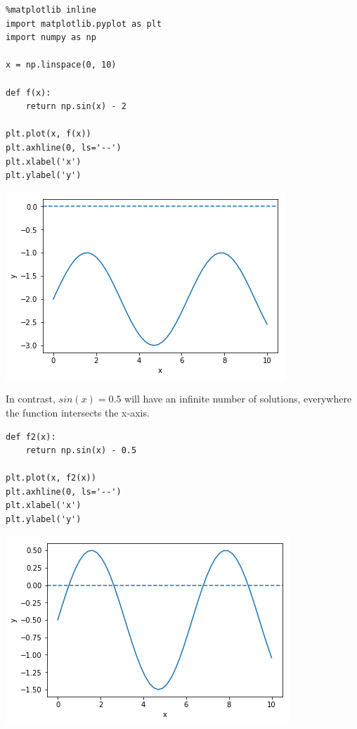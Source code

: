 \documentclass[11pt]{article}
\begin{document}
\begin{verbatim}
%matplotlib inline
import matplotlib.pyplot as plt
import numpy as np

x = np.linspace(0, 10)

def f(x):
    return np.sin(x) - 2

plt.plot(x, f(x))
plt.axhline(0, ls='--')
plt.xlabel('x')
plt.ylabel('y')
\end{verbatim}

\begin{center}
\includegraphics[width=.9\linewidth]{obipy-resources/a42b059ba3fd2f94b3a34f1c9b427f54-26729hzK.png}
\end{center}

In contrast, \(sin(x) = 0.5\) will have an infinite number of solutions, everywhere the function intersects the x-axis.

\begin{verbatim}
def f2(x):
    return np.sin(x) - 0.5

plt.plot(x, f2(x))
plt.axhline(0, ls='--')
plt.xlabel('x')
plt.ylabel('y')
\end{verbatim}

\begin{center}
\includegraphics[width=.9\linewidth]{obipy-resources/a42b059ba3fd2f94b3a34f1c9b427f54-26729u9Q.png}
\end{center}
\end{document}
